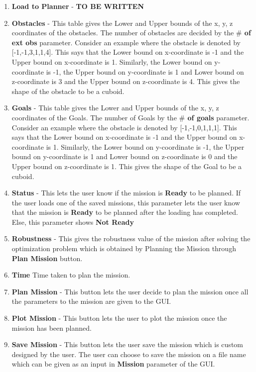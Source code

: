 \documentclass[english]{article}
\begin{document}
\begin{enumerate}
\begin{figure}[H]
    \end{figure}
    \item \textbf{Load to Planner} - \textbf{TO BE WRITTEN}
    \item \textbf{Obstacles} - This table gives the Lower and Upper bounds of the x, y, z coordinates of the obstacles. The number of obstacles are decided by the \textbf{$\#$ of ext obs} parameter. Consider an example where the obstacle is denoted by [-1,-1,3,1,1,4]. This says that the Lower bound on x-coordinate is -1 and the Upper bound on x-coordinate is 1. Similarly, the Lower bound on y-coordinate is -1, the Upper bound on y-coordinate is 1 and Lower bound on z-coordinate is 3 and the Upper bound on z-coordinate is 4. This gives the shape of the obstacle to be a cuboid.
    \item \textbf{Goals} - This table gives the Lower and Upper bounds of the x, y, z coordinates of the Goals. The number of Goals by the \textbf{$\#$ of goals} parameter. Consider an example where the obstacle is denoted by [-1,-1,0,1,1,1]. This says that the Lower bound on x-coordinate is -1 and the Upper bound on x-coordinate is 1. Similarly, the Lower bound on y-coordinate is -1, the Upper bound on y-coordinate is 1 and Lower bound on z-coordinate is 0 and the Upper bound on z-coordinate is 1. This gives the shape of the Goal to be a cuboid.
    \item \textbf{Status} - This lets the user know if the mission is \textbf{Ready} to be planned. If the user loads one of the saved missions, this parameter lets the user know that the mission is \textbf{Ready} to be planned after the loading has completed. Else, this parameter shows \textbf{Not Ready}
    \item \textbf{Robustness} - This gives the robustness value of the mission after solving the optimization problem which is obtained by Planning the Mission through \textbf{Plan Mission} button. 
    \item \textbf{Time} Time taken to plan the mission.
    \item \textbf{Plan Mission} - This button lets the user decide to plan the mission once all the parameters to the mission are given to the GUI. 
    \item \textbf{Plot Mission} - This button lets the user to plot the mission once the mission has been planned.
    \item \textbf{Save Mission} - This button lets the user save the mission which is custom designed by the user. The user can choose to save the mission on a file name which can be given as an input in \textbf{Mission} parameter of the GUI.
\end{enumerate}
\end{document}
